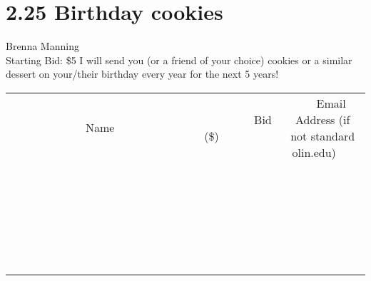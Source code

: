 \documentclass[11pt]{article}
\begin{document}
\section*{2.25 Birthday cookies}
Brenna Manning
\\
Starting Bid: \$5
\newline
I will send you (or a friend of your choice) cookies or a similar dessert on your/their birthday every year for the next 5 years!
\\[6ex]
\begin{tabular}{c c c}
~~~~~~~~~~~~~Name~~~~~~~~~~~~~ & ~~~~~~~~~Bid (\$)~~~~~~~~~  & ~~~Email Address (if not standard olin.edu)~~~\\
 & & \\
\hline
 & & \\
\hline
 & & \\
\hline
 & & \\
\hline
 & & \\
\hline
 & & \\
\hline
 & & \\
\hline
 & & \\
\hline
 & & \\
\hline
 & & \\
\hline
 & & \\
\hline
 & & \\
\hline
 & & \\
\hline
 & & \\
\hline
 & & \\
\hline
 & & \\
\hline
 & & \\
\hline
 & & \\
\hline
 & & \\
\hline
 & & \\
\hline
 & & \\
\hline
 & & \\
\hline
 & & \\
\hline
 & & \\
\hline
 & & \\
\hline
 & & \\
\hline
\end{tabular}
\newpage
\end{document}
